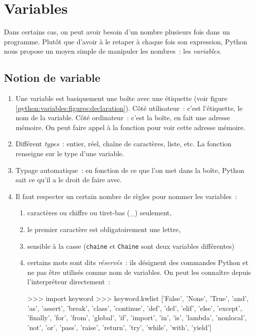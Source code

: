 

\chapter{Variables}

Dans certains cas, on peut avoir besoin d'un nombre plusieurs fois dans un programme. Plutôt
que d'avoir à le retaper à chaque fois son expression, Python nous propose un moyen simple
de manipuler les nombres~: les \textit{variables}.

\section{Notion de variable}
\begin{enumerate}
\item Une variable est basiquement une boîte avec une étiquette
(voir figure \ref{python:variables:figures:declaration}). Côté utilisateur~: c'est
l'étiquette, \cad{} le nom de la variable.
Côté ordinateur~: c'est la boîte, en fait une adresse mémoire.
On peut faire appel à la fonction  pour voir cette adresse mémoire.
\item Différent \textit{types}~: entier, réel, chaîne de caractères, liste, etc.
La fonction  renseigne sur le type d'une variable.
\item Typage automatique~: en fonction de ce que l'on met dans la boîte, Python sait ce qu'il a le
droit de faire avec.
\item Il faut respecter un certain nombre de règles pour nommer les variables~:
    \begin{enumerate}
    \item caractères ou chiffre ou tiret-bas (\_) seulement,
    \item le premier caractère est obligatoirement une lettre,
    \item sensible à la casse (\texttt{chaine} et \texttt{Chaine} sont deux variables différentes)
    \item certains mots sont dits \textit{réservés}~: ils désignent des commandes Python et ne
    pas être utilisés comme nom de variables. On peut les connaître depuis l'interpréteur
    directement~:
\begin{pythoncode}
>>> import keyword
>>> keyword.kwlist
['False', 'None', 'True', 'and', 'as', 'assert', 'break', 'class', 'continue', 'def', 'del', 'elif', 'else', 'except', 'finally', 'for', 'from', 'global', 'if', 'import', 'in', 'is', 'lambda', 'nonlocal', 'not', 'or', 'pass', 'raise', 'return', 'try', 'while', 'with', 'yield']
\end{pythoncode}
    \end{enumerate}
\end{enumerate}



